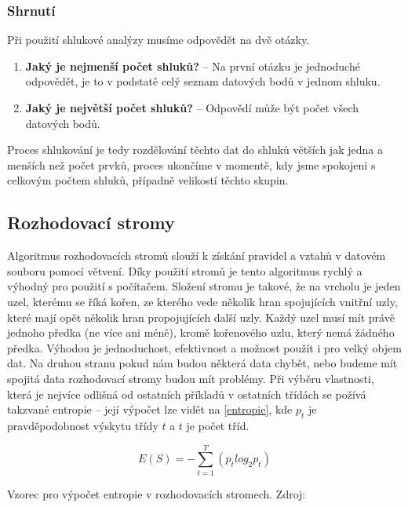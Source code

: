 \subsubsection{Shrnutí}
\par Při použití shlukové analýzy musíme odpovědět na dvě otázky.
\begin{enumerate}
  \item \textbf{Jaký je nejmenší počet shluků?} -- Na první otázku je jednoduché odpovědět, je to v podstatě celý seznam datových bodů v jednom shluku.
  \item \textbf{Jaký je největší počet shluků?} -- Odpovědí může být počet všech datových bodů.
\end{enumerate}
Proces shlukování je tedy rozdělování těchto dat do shluků větších jak jedna a menších než počet prvků, proces ukončíme v momentě, kdy jsme spokojeni s celkovým počtem shluků, případně velikostí těchto skupin. \cite{data-mining-practical}

\subsection{Rozhodovací stromy}
\par Algoritmus rozhodovacích stromů slouží k získání pravidel a vztahů v datovém souboru pomocí větvení. Díky použití stromů je tento algoritmus rychlý a výhodný pro použití s počítačem. Složení stromu je takové, že na vrcholu je jeden uzel, kterému se říká kořen, ze kterého vede několik hran spojujících vnitřní uzly, které mají opět několik hran propojujících další uzly. Každý uzel musí mít právě jednoho předka (ne více ani méně), kromě kořenového uzlu, který nemá žádného předka. Výhodou je jednoduchost, efektivnost a možnost použít i pro velký objem dat. Na druhou stranu pokud nám budou některá data chybět, nebo budeme mít spojitá data rozhodovací stromy budou mít problémy. \cite{data-mining-principles} Při výběru vlastnosti, která je nejvíce odlišná od ostatních příkladů v ostatních třídách se požívá takzvané entropie -- její výpočet lze vidět na \ref{entropie}, kde \(p_t\) je pravděpodobnost výskytu třídy \(t\) a \(t\) je počet tříd.
\begin{equationcap}
\begin{equation} \label{entropie}
E(S) = - \sum_{t=1}^{T}(p_t log_2 p_t)
\end{equation}
\caption[Vzorec pro výpočet entropie v rozhodovacích stromech]{Vzorec pro výpočet entropie v rozhodovacích stromech. Zdroj: \cite{data-mining-principles}}
\end{equationcap}

